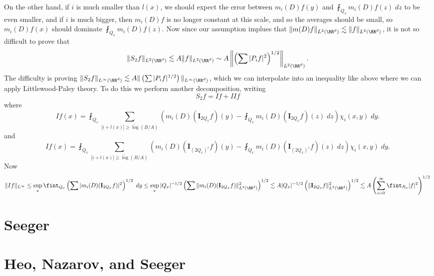 On the other hand, if $i$ is much smaller than $l(x)$, we should expect the error between $m_i(D) f(y)$ and $\fint_{Q_x} m_i(D) f(z)\; dz$ to be even smaller, and if $i$ is much bigger, then $m_i(D) f$ is no longer constant at this scale, and so the averages should be small, so $m_i(D) f(x)$ should dominate $\fint_{Q_x} m_i(D) f(z)$. Now since our assumption implues that $\| m(D) f \|_{L^2(\RR^d)} \lesssim \| f \|_{L^2(\RR^d)}$, it is not so difficult to prove that
%
\[ \| S_2 f \|_{L^2(\RR^d)} \lesssim A \| f \|_{L^2(\RR^d)} \sim A \left\| \left( \sum |P_i f|^2 \right)^{1/2} \right\|_{L^2(\RR^d)}. \]
%
The difficulty is proving $\| S_2 f \|_{L^\infty(\RR^d)} \lesssim A \| \left( \sum |P_i f|^{1/2} \right) \|_{L^\infty(\RR^d)}$, which we can interpolate into an inequality like above where we can apply Littlewood-Paley theory. To do this we perform another decomposition, writing
%
\[ S_2 f = I f + {II}f \]
%
where
%
\[ If(x) = \fint_{Q_x} \sum_{|i + l(x)| \geq \tilde\log(B/A)} \left( m_i(D) (\mathbf{I}_{2Q_x}f)(y) - \fint_{Q_x} m_i(D)(\mathbf{I}_{2Q_x} f)(z)\; dz \right) \chi_i(x,y)\; dy. \]
%
and
%
\[ If(x) = \fint_{Q_x} \sum_{|i + l(x)| \geq \tilde\log(B/A)} \left( m_i(D) (\mathbf{I}_{(2Q_x)^c}f)(y) - \fint_{Q_x} m_i(D)(\mathbf{I}_{(2Q_x)^c} f)(z)\; dz \right) \chi_i(x,y)\; dy. \]
%
Now
%
\[ \|If \|_{L^\infty} \leq \sup_x \fint_{Q_x} \left( \sum | m_i(D) (\mathbf{I}_{2Q_x} f) |^2 \right)^{1/2}\; dy \leq \sup_x |Q_x|^{-1/2} \left( \sum \| m_i(D) (\mathbf{I}_{2Q_x} f) \|_{L^2(\RR^d)}^2 \right)^{1/2} \lesssim A |Q_x|^{-1/2} \left( \| \mathbf{I}_{2Q_x} f \|_{L^2(\RR^d)}^2 \right)^{1/2} \lesssim A \left( \sum_{i = 0}^\infty \fint_{R_x} |f|^2 \right)^{1/2} \]





\chapter{Seeger}





\chapter{Heo, Nazarov, and Seeger}

